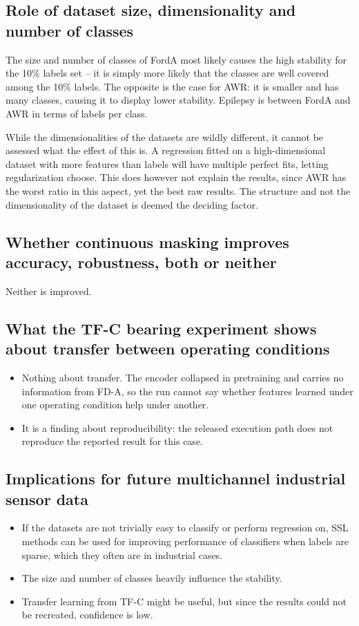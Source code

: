 \documentclass[a4paper,11pt]{article}
\begin{document}
\subsection{Role of dataset size, dimensionality and number of classes}
The size and number of classes of FordA most likely causes the high stability for the 10\% labels set -- it is simply more likely that the classes are well covered among the 10\% labels. The opposite is the case for AWR: it is smaller and has many classes, causing it to display lower stability. Epilepsy is between FordA and AWR in terms of labels per class.

While the dimensionalities of the datasets are wildly different, it cannot be assessed what the effect of this is. A regression fitted on a high-dimensional dataset with more features than labels will have multiple perfect fits, letting regularization choose. This does however not explain the results, since AWR has the worst ratio in this aspect, yet the best raw results. The structure and not the dimensionality of the dataset is deemed the deciding factor.

\subsection{Whether continuous masking improves accuracy, robustness, both or neither}
Neither is improved.

\subsection{What the TF-C bearing experiment shows about transfer between operating conditions}
\begin{itemize}
    \item Nothing about transfer. The encoder collapsed in pretraining and carries no information from FD-A, so the run cannot say whether features learned under one operating condition help under another.
    \item It is a finding about reproducibility: the released execution path does not reproduce the reported result for this case.
\end{itemize}

\subsection{Implications for future multichannel industrial sensor data}
\begin{itemize}
\item  If the datasets are not trivially easy to classify or perform regression on, SSL methods can be used for improving performance of classifiers when labels are sparse, which they often are in industrial cases.
\item The size and number of classes heavily influence the stability.
\item Transfer learning from TF-C might be useful, but since the results could not be recreated, confidence is low.
\end{itemize}
\end{document}
